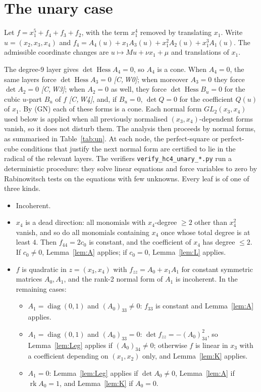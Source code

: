 \documentclass[11pt]{article}
\theoremstyle{remark}
\newcommand{\Hess}{\operatorname{Hess}}
\newcommand{\cert}[1]{\emph{[C,\,#1]}}
\begin{document}
\section{The unary case}\label{sec:un}
Let $f=x_1^5+f_4+f_3+f_2$, with the term $x_1^4$ removed by translating $x_1$. Write $u=(x_2,x_3,x_4)$ and $f_4=A_4(u)+x_1A_3(u)+x_1^2A_2(u)+x_1^3A_1(u)$. The admissible coordinate changes are $u\mapsto Mu+\nu x_1+\mu$ and translations of $x_1$.

The degree-9 layer gives $\det\Hess A_4=0$, so $A_4$ is a cone. When $A_4=0$, the same layers force $\det\Hess A_3=0$ \cert{W0}; when moreover $A_3=0$ they force $\det A_2=0$ \cert{W3}; when $A_2=0$ as well, they force $\det\Hess B_u=0$ for the cubic $u$-part $B_u$ of $f$ \cert{W4}, and, if $B_u=0$, $\det Q=0$ for the coefficient $Q(u)$ of $x_1$. By (GN) each of these forms is a cone. Each normal form $GL_2(x_3,x_4)$ used below is applied when all previously normalised $(x_3,x_4)$-dependent forms vanish, so it does not disturb them. The analysis then proceeds by normal forms, as summarised in Table~\ref{tab:un}. At each node, the perfect-square or perfect-cube conditions that justify the next normal form are certified to lie in the radical of the relevant layers. The verifiers \texttt{verify\_hc4\_unary\_*.py} run a deterministic procedure: they solve linear equations and force variables to zero by Rabinowitsch tests on the equations with few unknowns. Every leaf is of one of three kinds.

\begin{itemize}
\item[(I)] Incoherent.
\item[(D)] $x_4$ is a dead direction: all monomials with $x_4$-degree $\ge2$ other than $x_4^2$ vanish, and so do all monomials containing $x_4$ once whose total degree is at least $4$. Then $f_{44}=2c_0$ is constant, and the coefficient of $x_4$ has degree $\le2$. If $c_0\ne0$, Lemma~\ref{lem:A} applies; if $c_0=0$, Lemma~\ref{lem:L} applies.
\item[(Z)] $f$ is quadratic in $z=(x_3,x_4)$ with $f_{zz}=A_0+x_1A_1$ for constant symmetric matrices $A_0,A_1$, and the rank-2 normal form of $A_1$ is incoherent. In the remaining cases:
 \begin{itemize}
 \item $A_1=\operatorname{diag}(0,1)$ and $(A_0)_{33}\ne0$: $f_{33}$ is constant and Lemma~\ref{lem:A} applies.
 \item $A_1=\operatorname{diag}(0,1)$ and $(A_0)_{33}=0$: $\det f_{zz}=-(A_0)_{34}^2$, so Lemma~\ref{lem:Leg} applies if $(A_0)_{34}\ne0$; otherwise $f$ is linear in $x_3$ with a coefficient depending on $(x_1,x_2)$ only, and Lemma~\ref{lem:K} applies.
 \item $A_1=0$: Lemma~\ref{lem:Leg} applies if $\det A_0\ne0$, Lemma~\ref{lem:A} if $\operatorname{rk}A_0=1$, and Lemma~\ref{lem:K} if $A_0=0$.
 \end{itemize}
\end{itemize}
\end{document}
